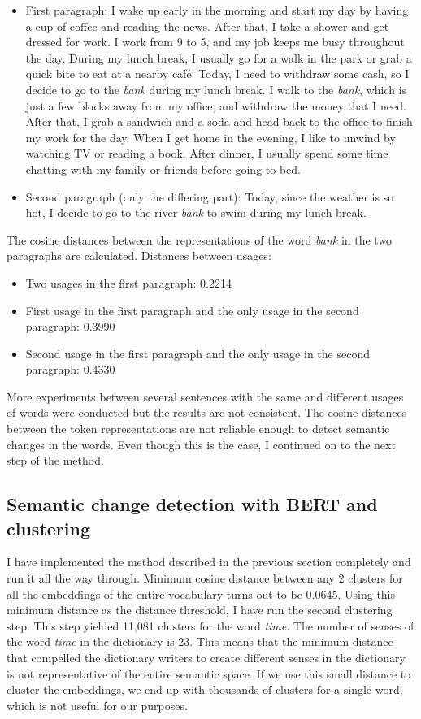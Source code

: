 \documentclass[11pt]{article}
\begin{document}
\begin{itemize}
  \item First paragraph: I wake up early in the morning and start my day by having a cup of coffee and reading the news. After that, I take a shower and get dressed for work. I work from 9 to 5, and my job keeps me busy throughout the day. During my lunch break, I usually go for a walk in the park or grab a quick bite to eat at a nearby café. {\color{red} Today, I need to withdraw some cash, so I decide to go to the \textit{bank} during my lunch break. I walk to the \textit{bank}, which is just a few blocks away from my office, and withdraw the money that I need.} After that, I grab a sandwich and a soda and head back to the office to finish my work for the day. When I get home in the evening, I like to unwind by watching TV or reading a book. After dinner, I usually spend some time chatting with my family or friends before going to bed.
  \item Second paragraph (only the differing part): {\color{red} Today, since the weather is so hot, I decide to go to the river \textit{bank} to swim during my lunch break.}
\end{itemize}

The cosine distances between the representations of the word \textit{bank} in the two paragraphs are calculated.
Distances between usages:
\begin{itemize}
  \item Two usages in the first paragraph: 0.2214
  \item First usage in the first paragraph and the only usage in the second paragraph: 0.3990
  \item Second usage in the first paragraph and the only usage in the second paragraph: 0.4330
\end{itemize}

More experiments between several sentences with the same and different usages of words were conducted but the results are not consistent.
The cosine distances between the token representations are not reliable enough to detect semantic changes in the words.
Even though this is the case, I continued on to the next step of the method.

\subsection{Semantic change detection with BERT and clustering}

I have implemented the method described in the previous section completely and run it all the way through.
Minimum cosine distance between any 2 clusters for all the embeddings of the entire vocabulary turns out to be $0.0645$.
Using this minimum distance as the distance threshold, I have run the second clustering step.
This step yielded 11,081 clusters for the word \textit{time}.
The number of senses of the word \textit{time} in the dictionary is 23.
This means that the minimum distance that compelled the dictionary writers to create different senses in the dictionary is not representative of the entire semantic space.
If we use this small distance to cluster the embeddings, we end up with thousands of clusters for a single word, which is not useful for our purposes.
\end{document}
